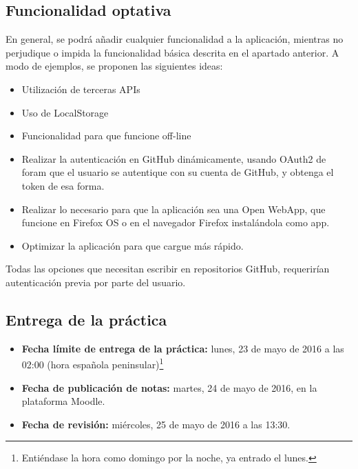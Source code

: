 \subsection{Funcionalidad optativa}

En general, se podrá añadir cualquier funcionalidad a la aplicación, mientras no perjudique o impida la funcionalidad básica descrita en el apartado anterior. A modo de ejemplos, se proponen las siguientes ideas:

\begin{itemize}
  \item Utilización de terceras APIs
  \item Uso de LocalStorage
  \item Funcionalidad para que funcione off-line
  \item Realizar la autenticación en GitHub dinámicamente, usando OAuth2 de foram que el usuario se autentique con su cuenta de GitHub, y obtenga el token de esa forma.
  \item Realizar lo necesario para que la aplicación sea una Open WebApp, que funcione en Firefox OS o en el navegador Firefox instalándola como app.
  \item Optimizar la aplicación para que cargue más rápido.
\end{itemize}

Todas las opciones que necesitan escribir en repositorios GitHub, requerirían autenticación previa por parte del usuario.

\subsection{Entrega de la práctica}

\begin{itemize}
  \item \textbf{Fecha límite de entrega de la práctica:} lunes, 23 de mayo de 2016 a las 02:00 (hora española peninsular)\footnote{Entiéndase la hora como domingo por la noche, ya entrado el lunes.}

  \item \textbf{Fecha de publicación de notas:} martes, 24 de mayo de 2016, en la plataforma Moodle.

  \item \textbf{Fecha de revisión:} miércoles, 25 de mayo de 2016 a las 13:30.
\end{itemize}

